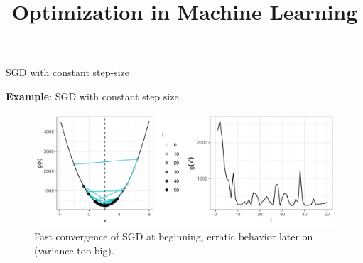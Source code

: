 \documentclass[11pt,compress,t,notes=noshow, xcolor=table]{beamer}
\title{Optimization in Machine Learning}
\date{}
\begin{document}
\sloppy


\begin{vbframe}{SGD with constant step-size}

\textbf{Example}: SGD with constant step size. 

\lz 

\begin{figure}
    \vspace{-0.3cm}
    \centering
    \includegraphics[width = 1\textwidth]{figure_man/sgd_example_erratic_behavior.png} \newline
    Fast convergence of SGD at beginning, erratic behavior later on (variance too big). 
\end{figure}

\end{vbframe}
\end{document}

